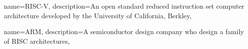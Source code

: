 \makeglossaries

{
    name={RISC-V},
    description={An open standard reduced instruction set computer architecture developed by the University of California, Berkley},
}

{
    name={ARM},
    description={A semiconductor design company who design a family of RISC architectures},
}


